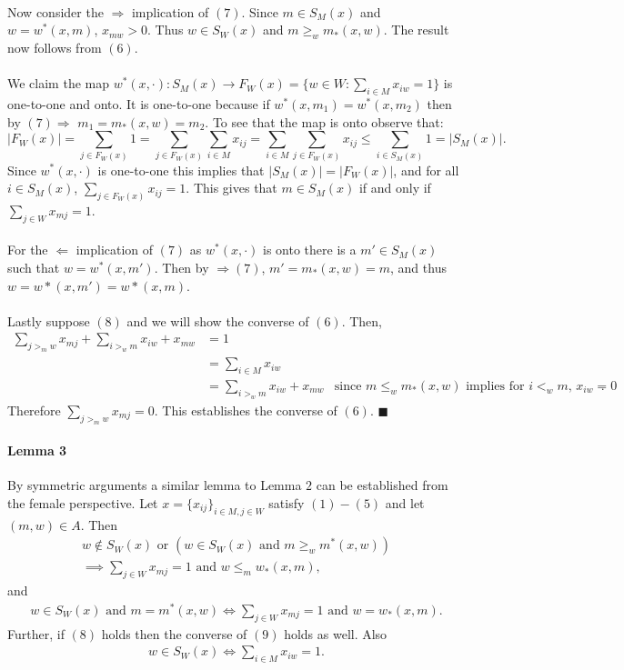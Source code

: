 \documentclass[letterpaper,12pt,oneside,onecolumn]{article}
\begin{document}
\paragraph{}
Now consider the $\Rightarrow$ implication of $(7)$. Since $m \in S_M(x)$ and $w = w^*(x,m)$, $x_{mw} > 0$. Thus $w \in S_W(x)$ and $m \geq_w m_*(x,w)$. The result now follows from $(6)$.
\paragraph{}
We claim the map $w^*(x,\cdot) : S_M(x) \rightarrow F_W(x) = \{ w \in W: \sum_{i \in M} x_{iw} = 1 \}$ is one-to-one and onto. It is one-to-one because if $w^*(x,m_1) = w^*(x,m_2)$ then by $(7) \Rightarrow$ $m_1 = m_*(x,w) = m_2$. To see that the map is onto  observe that:
$$ |F_W(x)| = \sum_{j \in F_W(x)} 1 = \sum_{j \in F_W(x)} \sum_{i\in M} x_{ij} = \sum_{i \in M} \sum_{j\in F_W(x)} x_{ij} \leq \sum_{i \in S_M(x)} 1 = |S_M(x)|.$$
Since $w^*(x,\cdot)$ is one-to-one this implies that $|S_M(x)| = |F_W(x)|$, and for all $i \in S_M(x)$, $\sum_{j \in F_W(x)} x_{ij} = 1$. This gives that $m \in S_M(x)$ if and only if $\sum_{j \in W} x_{mj} = 1$.
\paragraph{}
For the $\Leftarrow$ implication of $(7)$ as $w^*(x, \cdot)$ is onto there is a $m' \in S_M(x)$ such that $w=w^*(x,m')$. Then by $\Rightarrow (7)$, $m'=m_*(x,w)=m$, and thus $w=w*(x,m')=w*(x,m)$.
\paragraph{}
Lastly suppose $(8)$ and we will show the converse of $(6)$. Then,
\begin{align*}
\sum_{j >_m w} x_{mj} + \sum_{i >_w m} x_{iw} + x_{mw} &= 1 \\
&= \sum_{i \in M} x_{iw} \\
&= \sum_{i >_w m} x_{iw} + x_{mw} &\text{since $m \leq_w m_*(x,w)$ implies for $i <_w m$, $x_{iw} = 0$}.
\end{align*}
Therefore $\sum_{j >_m w} x_{mj} = 0$. This establishes the converse of $(6)$. $\blacksquare$
\paragraph{Lemma 3}
By symmetric arguments a similar lemma to Lemma $2$ can be established from the female perspective.
Let $x = \{x_{ij}\}_{i\in M, j\in W}$ satisfy $(1) - (5)$ and let $(m,w) \in A$. Then 
\begin{align}
w\not\in S_W(x) \text{ or } (w\in S_W(x) \text{ and } m \geq_{w} m^*(x,w)) \nonumber\\\implies \sum_{j\in W} x_{mj} = 1 \text{ and }w \leq_m w_*(x,m),
\end{align}
and
\begin{align}
w\in S_W(x) \text{ and } m = m^*(x,w) \iff \sum_{j \in W} x_{mj} = 1 \text{ and } w = w_*(x,m).
\end{align}
Further, if $(8)$ holds then the converse of $(9)$ holds as well. Also 
\begin{align*}
w \in S_W(x) \iff \sum_{i \in M} x_{iw} = 1.
\end{align*}
\end{document}
